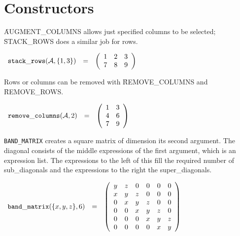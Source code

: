 \section{Constructors}

\f{AUGMENT\_COLUMNS} allows just specified
columns to be selected; \f{STACK\_ROWS} does
a similar job for rows.

\begin{math}  
\begin{array}{ccc}
{\tt stack\_rows}({\cal A},\{1,3\}) & = & 
\left( \begin{array}{ccc} 1 & 2 & 3 \\ 7 & 8 & 9
\end{array} \right)  
\end{array}  
\end{math}

Rows or columns can be removed with
\f{REMOVE\_COLUMNS} and
\f{REMOVE\_ROWS}.

\begin{flushleft}  
\hspace*{0.1in}
\begin{math}  
\begin{array}{ccc}
{\tt remove\_columns}({\cal A},2) & = & 
        \left( \begin{array}{cc} 1 & 3 \\ 4 & 6 \\ 7 & 9  
 \end{array} \right) 
\end{array}
\end{math}  
\end{flushleft}


{\tt BAND\_MATRIX} creates a square matrix of
dimension its second argument.  The diagonal consists of the middle
expressions of the first argument, which is an expression list. The
expressions to the left of this fill the required number of
sub\_diagonals and the expressions to the right the super\_diagonals. 

\begin{math}  
\begin{array}{ccc}
{\tt band\_matrix}(\{x,y,z\},6) & = & 
\left( \begin{array}{cccccc} y & z & 0 & 0 & 0 & 0 \\ x & y & z & 0 & 0
& 0 \\ 0 & x & y & z & 0 & 0 \\ 0 & 0 & x & y & z & 0 \\ 0 & 0 & 0 & x &
 y & z \\ 0 & 0 & 0 & 0 & x & y 
\end{array} \right)
\end{array}  
\end{math}  

